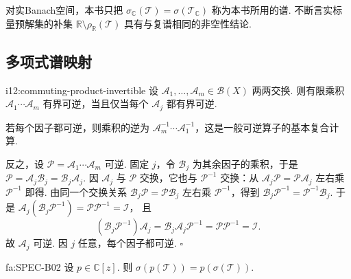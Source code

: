 \begin{FARemark}[实算子的谱语言]
对实Banach空间，本书只把 \(\displaystyle \sigma_{\mathbb C}(\mathcal T)=\sigma(\mathcal T_{\mathbb C})\) 称为本书所用的谱. 不断言实标量预解集的补集 \(\displaystyle \mathbb R\setminus\rho_{\mathbb R}(\mathcal T)\) 具有与复谱相同的非空性结论.
\end{FARemark}

\subsection{多项式谱映射}\label{subsec:i12-polynomial-mapping}

\begin{FALemma}[B][交换因子乘积的可逆性]{i12:commuting-product-invertible}
设 \(\displaystyle \mathcal A_1,\dots,\mathcal A_m\in\mathcal B(X)\) 两两交换. 则有限乘积 \(\displaystyle \mathcal A_1\cdots\mathcal A_m\) 有界可逆，当且仅当每个 \(\displaystyle \mathcal A_j\) 都有界可逆.
\end{FALemma}

\begin{FAProof}
若每个因子都可逆，则乘积的逆为 \(\displaystyle \mathcal A_m^{-1}\cdots\mathcal A_1^{-1}\)，这是一般可逆算子的基本复合计算.

反之，设 \(\displaystyle \mathcal P=\mathcal A_1\cdots\mathcal A_m\) 可逆. 固定 \(\displaystyle j\)，令 \(\displaystyle \mathcal B_j\) 为其余因子的乘积，于是 \(\displaystyle \mathcal P=\mathcal A_j\mathcal B_j=\mathcal B_j\mathcal A_j\). 因 \(\displaystyle \mathcal A_j\) 与 \(\displaystyle \mathcal P\) 交换，它也与 \(\displaystyle \mathcal P^{-1}\) 交换：从 \(\displaystyle \mathcal A_j\mathcal P=\mathcal P\mathcal A_j\) 左右乘 \(\displaystyle \mathcal P^{-1}\) 即得. 由同一个交换关系 \(\displaystyle \mathcal B_j\mathcal P=\mathcal P\mathcal B_j\) 左右乘 \(\displaystyle \mathcal P^{-1}\)，得到 \(\displaystyle \mathcal B_j\mathcal P^{-1}=\mathcal P^{-1}\mathcal B_j\). 于是
\(\displaystyle \mathcal A_j(\mathcal B_j\mathcal P^{-1}) = \mathcal P\mathcal P^{-1} = \mathcal I\)，
且
\[
(\mathcal B_j\mathcal P^{-1})\mathcal A_j
=
\mathcal B_j\mathcal A_j\mathcal P^{-1}
=
\mathcal P\mathcal P^{-1}
=
\mathcal I.
\]
故 \(\displaystyle \mathcal A_j\) 可逆. 因 \(\displaystyle j\) 任意，每个因子都可逆.
\hfill\(\square\)
\end{FAProof}

\begin{FATheorem}[B][多项式谱映射]{fa:SPEC-B02}
设 \(\displaystyle p\in\mathbb C[z]\). 则
\(\displaystyle \sigma(p(\mathcal T)) = p(\sigma(\mathcal T))\).
\end{FATheorem}

